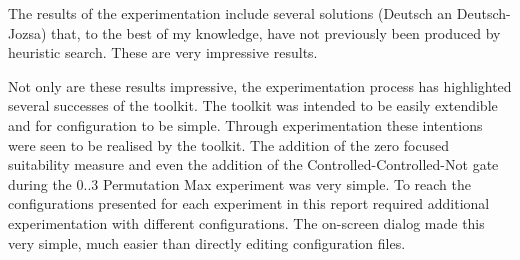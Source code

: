 The results of the experimentation include several solutions (Deutsch an Deutsch-Jozsa) that, to the best of my knowledge, have not previously been produced by heuristic search.
These are very impressive results.

Not only are these results impressive, the experimentation process has highlighted several successes of the toolkit.
The toolkit was intended to be easily extendible and for configuration to be simple.
Through experimentation these intentions were seen to be realised by the toolkit.
The addition of the zero focused suitability measure and even the addition of the Controlled-Controlled-Not gate during the $0..3$ Permutation Max experiment was very simple.
To reach the configurations presented for each experiment in this report required additional experimentation with different configurations.
The on-screen dialog made this very simple, much easier than directly editing configuration files.







